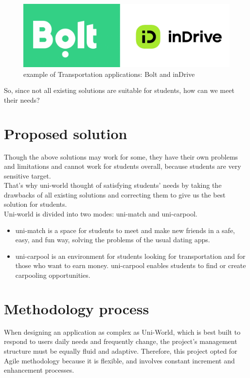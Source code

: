 \begin{figure}[H] 
            \centering
            \includegraphics[scale=0.5]{apps_logo.png}
            \caption{example of Transportation applications: Bolt and inDrive} 
            \label{fig: example of Transportation apps}
\end{figure}

So, since not all existing solutions are suitable for students, how can we meet their needs?

\section{Proposed solution}
Though the above solutions may work for some, they have their own problems and limitations and cannot work for students overall, because students are very sensitive target. \\
That’s why uni-world thought of satisfying students’ needs by taking the drawbacks of all existing solutions and correcting them to give us the best solution for students. \\

Uni-world is divided into two modes: uni-match and uni-carpool.
\begin{itemize}
\item uni-match is a space for students to meet and make new friends in a safe, easy, and fun way, solving the problems of the usual dating apps.
\item uni-carpool is an environment for students looking for transportation and for those who want to earn money. uni-carpool enables students to find or create carpooling opportunities.
\end{itemize}


\section{Methodology process}

When designing an application as complex as Uni-World, which is best built to respond to users daily needs and frequently change, the project’s management structure must be equally fluid and adaptive. Therefore, this project opted for Agile methodology because it is flexible, and involves constant increment and enhancement processes. 
